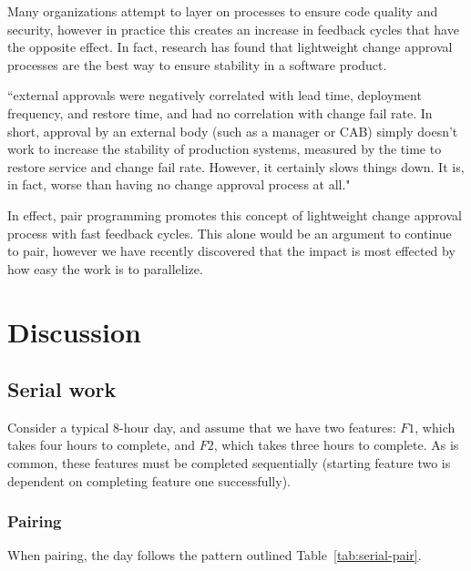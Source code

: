 \documentclass[letterpaper]{article}
\theoremstyle{definition}
\begin{document}
    Many organizations attempt to layer on processes to ensure code quality and security, however in practice this
    creates an increase in feedback cycles that have the opposite effect.
    In fact, research has found that lightweight change approval processes are the best way to ensure stability in a
    software product.

    \begin{displayquote}
    ``external approvals were negatively correlated with lead time, deployment frequency, and restore time, and had no
    correlation with change fail rate.
    In short, approval by an external body (such as a manager or CAB) simply doesn't work to increase the stability of
    production systems, measured by the time to restore service and change fail rate.
    However, it certainly slows things down.
    It is, in fact, worse than having no change approval process at all."
    \end{displayquote}

    In effect, pair programming promotes this concept of lightweight change approval process with fast feedback cycles.
    This alone would be an argument to continue to pair, however we have recently discovered that the impact is most
    effected by how easy the work is to parallelize.


    \section{Discussion}\label{sec:discussion}

    \subsection{Serial work}\label{subsec:serial-work}

    Consider a typical 8-hour day, and assume that we have two features: $F1$, which takes four hours to complete, and
    $F2$, which takes three hours to complete.
    As is common, these features must be completed sequentially (starting feature two is dependent on completing feature
    one successfully).

    \subsubsection{Pairing}\label{subsubsec:serial-pairing}

    When pairing, the day follows the pattern outlined Table~\ref{tab:serial-pair}.
\end{document}
